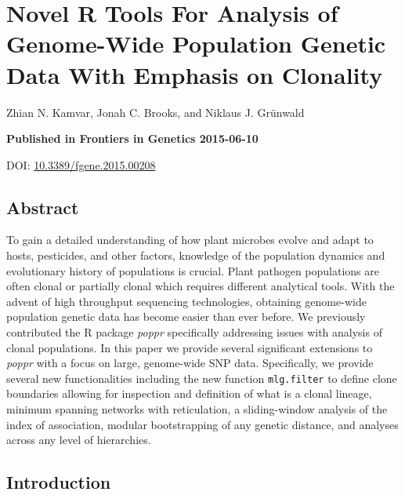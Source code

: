\documentclass[double,12pt]{beavtex}
\begin{document}
  \chapter{Novel R Tools For Analysis of Genome-Wide Population Genetic
  Data With Emphasis on
  Clonality}\label{novel-r-tools-for-analysis-of-genome-wide-population-genetic-data-with-emphasis-on-clonality}
  
  Zhian N. Kamvar, Jonah C. Brooks, and Niklaus J. Grünwald
  
  \vspace*{\fill}
  
  \textbf{Published in Frontiers in Genetics 2015-06-10}
  
  DOI:
  \href{http://dx.doi.org/10.3389/fgene.2015.00208}{10.3389/fgene.2015.00208}
  
  \newpage
  
  \section{Abstract}\label{abstract-1}
  
  To gain a detailed understanding of how plant microbes evolve and adapt
  to hosts, pesticides, and other factors, knowledge of the population
  dynamics and evolutionary history of populations is crucial. Plant
  pathogen populations are often clonal or partially clonal which requires
  different analytical tools. With the advent of high throughput
  sequencing technologies, obtaining genome-wide population genetic data
  has become easier than ever before. We previously contributed the R
  package \emph{poppr} specifically addressing issues with analysis of
  clonal populations. In this paper we provide several significant
  extensions to \emph{poppr} with a focus on large, genome-wide SNP data.
  Specifically, we provide several new functionalities including the new
  function \texttt{mlg.filter} to define clone boundaries allowing for
  inspection and definition of what is a clonal lineage, minimum spanning
  networks with reticulation, a sliding-window analysis of the index of
  association, modular bootstrapping of any genetic distance, and analyses
  across any level of hierarchies.
  
  \section{Introduction}\label{introduction-1}
  
\end{document}
